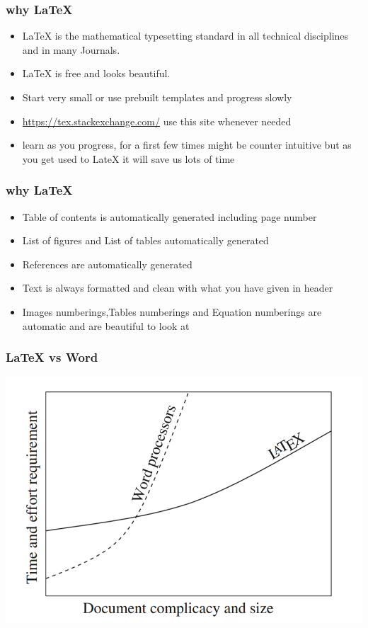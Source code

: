 \documentclass{beamer}
\begin{document}
\begin{frame}
\frametitle{why \LaTeX }
\begin{itemize}
\item LaTeX is the mathematical typesetting standard in all technical disciplines and in many Journals.
\item LaTeX is free and looks beautiful.
\item Start very small or use prebuilt templates and progress slowly
\item \url{https://tex.stackexchange.com/} use this site whenever needed
\item learn as you progress, for a first few times might be counter intuitive but as you get used to LateX it will save us lots of time
\end{itemize}
\end{frame}
\begin{frame}
\frametitle{why \LaTeX }
\begin{itemize}
\Large \item Table of contents is automatically generated including page number
\item List of figures and List of tables automatically generated
\item References are automatically generated
\item Text is always formatted and clean with what you have given in header
\item Images numberings,Tables numberings and Equation numberings are automatic and are beautiful to look at
\end{itemize}
\end{frame}
\begin{frame}
\frametitle{LaTeX vs Word}
%
\begin{center}
%
\includegraphics[width=0.75\linewidth]{complexity}
\end{center}
%
\end{frame}
\end{document}
